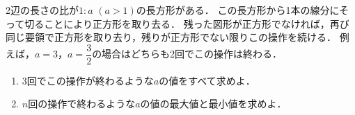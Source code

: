 \documentclass[../../main.tex]{subfiles}
\begin{document}
2辺の長さの比が$1:a$ $(a>1)$の長方形がある．
この長方形から1本の線分にそって切ることにより正方形を取り去る．
残った図形が正方形でなければ，再び同じ要領で正方形を取り去り，残りが正方形でない限りこの操作を続ける．
例えば，$a=3$，$\displaystyle a=\dfrac{3}{2}$の場合はどちらも2回でこの操作は終わる．
\begin{enumerate}
  \item 3回でこの操作が終わるような$a$の値をすべて求めよ．
  \item $n$回の操作で終わるような$a$の値の最大値と最小値を求めよ．
\end{enumerate}
\end{document}
